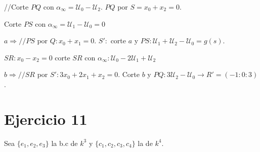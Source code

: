 \documentclass[10pt,a4paper,openright]{book}
\theoremstyle{break}
\begin{document}
//Corte $PQ$ con $\alpha_{\infty} = \mathcal{U}_0 - \mathcal{U}_2$. $PQ$ por $S = x_0 + x_2 = 0$.

Corte $PS$ con $\alpha_{\infty} = \mathcal{U}_1 - \mathcal{U}_0 = 0$

$a \Rightarrow // PS$ por $Q: x_0 + x_1 = 0$. $S': $ corte $a$ y $PS: \mathcal{U}_1 + \mathcal{U}_2 - \mathcal{U}_0 = g\left( s \right)$.

$SR: x_0 - x_2 = 0$ corte $SR$ con $\alpha_{\infty}: \mathcal{U}_0 - 2\mathcal{U}_1 + \mathcal{U}_2$

$b \Rightarrow // SR$ por $S': 3x_0 + 2x_1 + x_2 = 0$. Corte $b$ y $PQ: 3\mathcal{U}_2 - \mathcal{U}_0 \rightarrow R' = \left( -1 : 0 : 3 \right)$.

\section{Ejercicio 11}%
\label{sec:ejercicio_11_2}
Sea $\{e_1, e_2, e_3\}$ la b.c de $k^3$ y $\{c_1, c_2, c_3, c_4\}$ la de $k^4$.
\end{document}
